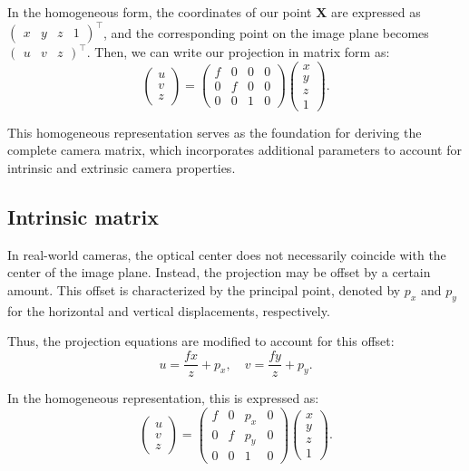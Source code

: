 \documentclass[12pt]{article}
\begin{document}
In the homogeneous form, the coordinates of our point $\mathbf{X}$ are expressed as $\begin{pmatrix} x & y & z & 1 \end{pmatrix}^\top$, and the corresponding point on the image plane becomes $\begin{pmatrix} u & v & z \end{pmatrix}^\top$. Then, we can write our projection in matrix form as:
$$
\begin{pmatrix} u \\ v \\ z \end{pmatrix} = 
\begin{pmatrix}
    f & 0 & 0 & 0 \\
    0 & f & 0 & 0 \\
    0 & 0 & 1 & 0
\end{pmatrix}
\begin{pmatrix} x \\ y \\ z \\ 1 \end{pmatrix}.
$$

This homogeneous representation serves as the foundation for deriving the complete camera matrix, which incorporates additional parameters to account for intrinsic and extrinsic camera properties.

\subsection{Intrinsic matrix}

In real-world cameras, the optical center does not necessarily coincide with the center of the image plane. Instead, the projection may be offset by a certain amount. This offset is characterized by the principal point, denoted by $p_x$ and $p_y$ for the horizontal and vertical displacements, respectively.

Thus, the projection equations are modified to account for this offset:
$$
u = \frac{f x}{z} + p_x, \quad v = \frac{f y}{z} + p_y.
$$

In the homogeneous representation, this is expressed as:
$$
\begin{pmatrix} u \\ v \\ z \end{pmatrix} = 
\begin{pmatrix}
f & 0 & p_x & 0 \\
0 & f & p_y & 0 \\
0 & 0 & 1 & 0
\end{pmatrix}
\begin{pmatrix} x \\ y \\ z \\ 1 \end{pmatrix}.
$$
\end{document}
